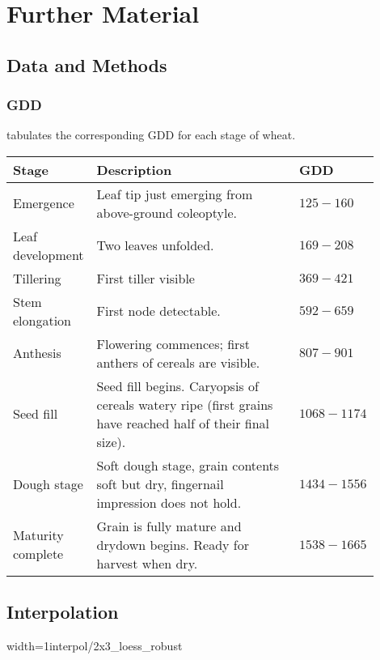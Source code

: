 \chapter{Further Material}

\section{Data and Methods}{
	\subsection{GDD}\label{app:gdd_examples}
		\cite{baileyUsingGrowingDegree2018} tabulates the corresponding GDD for each stage of wheat.
		\begin{table}[H]
			\centering
			\small
			\begin{tabular}{p{0.2\linewidth} p{0.57\linewidth}  p{0.13\linewidth}} 
				\toprule
				Stage  & Description    & GDD \\
				\hline Emergence & Leaf tip just emerging from above-ground coleoptyle. & $125-160$ \\
				\hline Leaf development & Two leaves unfolded. & $169-208$ \\
				\hline Tillering & First tiller visible  & $369-421$ \\
				\hline Stem elongation & First node detectable. & $592-659$ \\
				\hline Anthesis & Flowering commences; first anthers of cereals are visible. & $807-901$ \\
				\hline Seed fill & Seed fill begins. Caryopsis of cereals watery ripe (first grains have reached half of their final size). & $1068-1174$ \\
				\hline Dough stage & Soft dough stage, grain contents soft but dry, fingernail impression does not hold. & $1434-1556$ \\
				\hline Maturity complete & Grain is fully mature and drydown begins. Ready for harvest when dry. & $1538-1665$ \\
				\bottomrule
			\end{tabular}
		\end{table}
}


\section{Interpolation}
\begin{my_figure}[!h]{width=1\textwidth}{interpol/2x3_loess_robust}
	\caption{The LOESS smoother \RobItPlot}
	\label{fig:interpol/2x3_loess_robust}
\end{my_figure}

